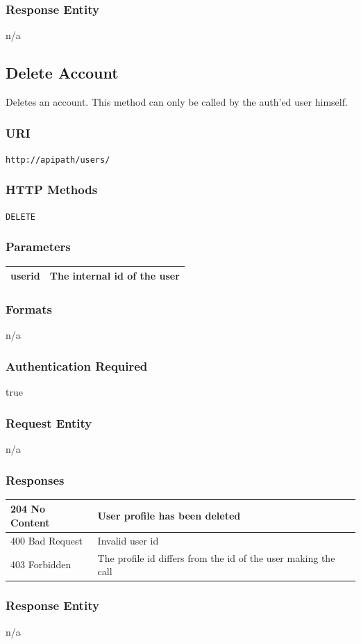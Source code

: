 \documentclass[10pt]{article}
\begin{document}
\subsubsection{Response Entity}
n/a
\subsection{Delete Account}
Deletes an account. This method can only be called by the auth'ed user himself. 
\subsubsection{URI}
\texttt{http://apipath/users/
}\subsubsection{HTTP Methods}
\texttt{DELETE}
\subsubsection{Parameters}
\begin{tabular}{|l|l|}\hline
userid & The internal id of the user \\
\hline
\end{tabular}
\subsubsection{Formats}
n/a
\subsubsection{Authentication Required}
true
\subsubsection{Request Entity}
n/a
\subsubsection{Responses}
\begin{tabular}{|l|l|}\hline
204 No Content & User profile has been deleted \\
\hline
400 Bad Request & Invalid user id \\
\hline
403 Forbidden & The profile id differs from the id of the user making the call \\
\hline
\end{tabular}
\subsubsection{Response Entity}
n/a
\end{document}
